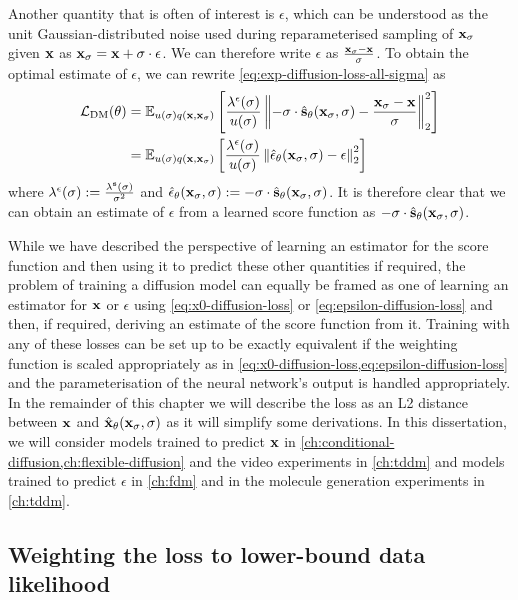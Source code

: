 Another quantity that is often of interest is $\epsilon$, which can be understood as the unit Gaussian-distributed noise used during reparameterised sampling of ${\mathbf{x}}_\sigma$ given ${\mathbf{x}}$ as ${\mathbf{x}}_\sigma = {\mathbf{x}} + \sigma \cdot \epsilon$. We can therefore write $\epsilon$ as $\frac{{\mathbf{x}}_\sigma-{\mathbf{x}}}{\sigma}$. To obtain the optimal estimate of $\epsilon$, we can rewrite \cref{eq:exp-diffusion-loss-all-sigma} as
\begin{align} \label{eq:epsilon-diffusion-loss}
    {\mathcal{L}}_\text{DM}(\theta) &= \mathbb{E}_{u(\sigma)q({\mathbf{x}}, {\mathbf{x}}_\sigma)} \left[ 
    \frac{\lambda^\epsilon(\sigma)}{u(\sigma)} \left\| -\sigma \cdot \hat{{\mathbf{s}}}_\theta({\mathbf{x}}_\sigma, \sigma) - \frac{{\mathbf{x}}_\sigma-{\mathbf{x}}}{\sigma} \right\|_2^2 \right] \\
    &= \mathbb{E}_{u(\sigma)q({\mathbf{x}}, {\mathbf{x}}_\sigma)} \left[ 
    \frac{\lambda^\epsilon(\sigma)}{u(\sigma)} \left\| \hat{\mathbf{\epsilon}}_\theta({\mathbf{x}}_\sigma, \sigma) - \epsilon \right\|_2^2 \right]
\end{align}
where $\lambda^\epsilon(\sigma) := \frac{\lambda^{\mathbf{s}}(\sigma)}{\sigma^2}$ and $\hat{\mathbf{\epsilon}}_\theta({\mathbf{x}}_\sigma, \sigma) := -\sigma \cdot \hat{{\mathbf{s}}}_\theta({\mathbf{x}}_\sigma, \sigma)$. It is therefore clear that we can obtain an estimate of $\epsilon$ from a learned score function as $-\sigma \cdot \hat{{\mathbf{s}}}_\theta({\mathbf{x}}_\sigma, \sigma)$.

While we have described the perspective of learning an estimator for the score function and then using it to predict these other quantities if required, the problem of training a diffusion model can equally be framed as one of learning an estimator for ${\mathbf{x}}$ or $\epsilon$ using \cref{eq:x0-diffusion-loss} or \cref{eq:epsilon-diffusion-loss} and then, if required, deriving an estimate of the score function from it. Training with any of these losses can be set up to be exactly equivalent if the weighting function is scaled appropriately as in \cref{eq:x0-diffusion-loss,eq:epsilon-diffusion-loss} and the parameterisation of the neural network's output is handled appropriately. In the remainder of this chapter we will describe the loss as an L2 distance between ${\mathbf{x}}$ and $\hat{{\mathbf{x}}}_\theta({\mathbf{x}}_\sigma, \sigma)$ as it will simplify some derivations. In this dissertation, we will consider models trained to predict ${\mathbf{x}}$ in \cref{ch:conditional-diffusion,ch:flexible-diffusion} and the video experiments in \cref{ch:tddm} and models trained to predict $\epsilon$ in \cref{ch:fdm} and in the molecule generation experiments in \cref{ch:tddm}.

\subsection{Weighting the loss to lower-bound data likelihood} \label{sec:diffusion-likelihood}

